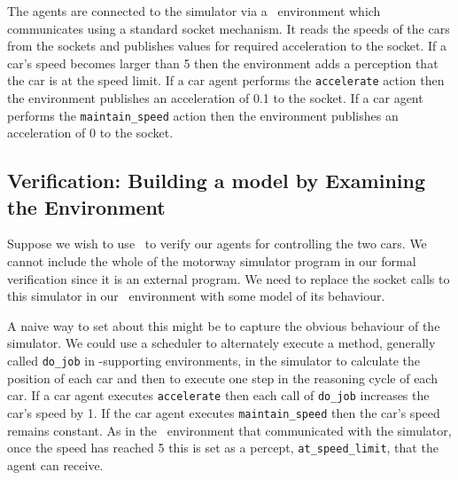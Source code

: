 \begin{sloppypar}
The agents are connected to the simulator via a \java\ environment
which communicates using a standard socket mechanism.  It reads the
speeds of the cars from the sockets and publishes values for
required acceleration to the socket.  If a car's speed becomes larger than 5
then the environment adds a perception that the car is at the speed
limit.  If a car agent performs the \lstinline{accelerate} action
then the environment publishes an acceleration of 0.1 to the socket.
If a car agent performs the \lstinline{maintain_speed} action then
the environment publishes an acceleration of 0 to the socket.
\end{sloppypar}

\subsection{Verification: Building a model by Examining the Environment}
%
Suppose we wish to use \ajpf\ to verify our agents for controlling the
two cars.  We cannot include the whole of the motorway simulator
program in our formal verification since it is an external program.
We need to replace the socket calls to this simulator in our \java\
environment with some model of its behaviour.

\begin{sloppypar}
A naive way to set about this might be to capture the obvious
behaviour of the simulator.  We could use a scheduler to alternately
execute a method, generally called \lstinline{do_job} in \ail-supporting environments,  in the simulator to calculate
the position of each car and then to execute one step in the reasoning
cycle of each car.  If a car agent executes \lstinline{accelerate}
then each call of \lstinline{do_job} increases the car's speed by 1.  If
the car agent executes \lstinline{maintain_speed} then the car's speed
remains constant.  As in the \java\ environment that communicated with
the simulator, once the speed has reached 5 this is set as a percept, \lstinline{at_speed_limit},
that the agent can receive.
\end{sloppypar}


